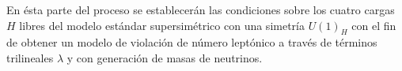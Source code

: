 \begin{itemize}
\begin{proyecto}
  En ésta parte del proceso se establecerán las condiciones sobre los
  cuatro cargas $H$ libres del modelo estándar supersimétrico con una
  simetría $U(1)_H$ con el fin de obtener un modelo de violación de
  número leptónico a través de términos trilineales $\lambda$ y con generación de masas de neutrinos.
\end{proyecto}


\end{itemize}
